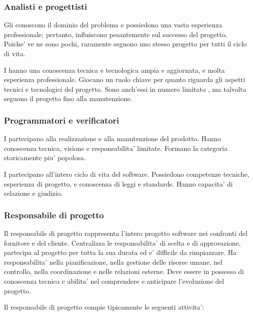 \subsubsection{Analisti e progettisti}

Gli  conoscono il dominio del problema e possiedono una vasta
esperienza professionale; pertanto, influiscono pesantemente sul successo del
progetto. Poiche' ve ne sono pochi, raramente seguono uno stesso progetto per
tutti il ciclo di vita. 

I  hanno una conoscenza tecnica e tecnologica ampia e
aggiornata, e molta esperienza professionale. Giocano un ruolo chiave per quanto
riguarda gli aspetti tecnici e tecnologici del progetto. Sono anch'essi in
numero limitato , ma talvolta seguono il progetto fino alla
manutenzione.

\subsubsection{Programmatori e verificatori}

I  partecipano alla realizzazione e alla manutenzione del
prodotto. Hanno conoscenza tecnica, visione e responsabilita' limitate. Formano
la categoria storicamente piu' popolosa.

I  partecipano all'intero ciclo di vita del software.
Possiedono competenze tecniche, esperienza di progetto, e conoscenza di leggi e
standards. Hanno capacita' di relazione e giudizio.

\subsubsection{Responsabile di progetto}

Il responsabile di progetto rappresenta l'intero progetto software nei confronti
del fornitore e del cliente. Centralizza le responsabilita' di scelta e di
approvazione, partecipa al progetto per tutta la sua durata ed e' difficile da
rimpiazzare. Ha responsabilita' nella pianificazione, nella gestione delle
risorse umane, nel controllo, nella coordinazione e nelle relazioni esterne.
Deve essere in possesso di conoscenza tecnica e abilita' nel comprendere e
anticipare l'evoluzione del progetto.

Il responsabile di progetto compie tipicamente le seguenti attivita':

